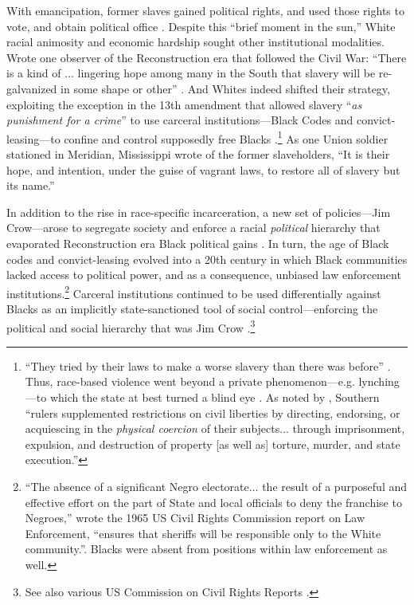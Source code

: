 \documentclass[12pt]{article}
\begin{document}
With emancipation, former slaves gained political rights, and used those rights to vote, and obtain political office .  Despite this ``brief moment in the sun,'' White racial animosity and economic hardship sought other institutional modalities.  Wrote one observer of the Reconstruction era that followed the Civil War: ``There is a kind of $\ldots$ lingering hope among many in the South that slavery will be re-galvanized in some shape or other'' . And Whites indeed shifted their strategy, exploiting the exception in the 13th amendment that allowed slavery ``\emph{as punishment for a crime}'' to use carceral institutions---Black Codes and convict-leasing---to confine and control supposedly free Blacks .\footnote{``They tried by their laws to make a worse slavery than there was before'' . Thus, race-based violence went beyond a private phenomenon---e.g. lynching---to which the state at best turned a blind eye .  As noted by , Southern ``rulers supplemented restrictions on civil liberties by directing, endorsing, or acquiescing in the \emph{physical coercion} of their subjects$\ldots$ through imprisonment, expulsion, and destruction of property [as well as] torture, murder, and state execution.''}  As one Union soldier stationed in Meridian, Mississippi wrote of the former slaveholders, ``It is their hope, and intention, under the guise of vagrant laws, to restore all of slavery but its name.''

In addition to the rise in race-specific incarceration, a new set of policies---Jim Crow---arose to segregate society and enforce a racial \emph{political} hierarchy that evaporated Reconstruction era Black political gains . In turn, the age of Black codes and convict-leasing evolved into a 20th century in which Black communities lacked access to political power, and as a consequence, unbiased law enforcement institutions.\footnote{``The absence of a significant Negro electorate$\ldots$ the result of a purposeful and effective effort on the part of State and local officials to deny the franchise to Negroes,'' wrote the 1965 US Civil Rights Commission report on Law Enforcement, ``ensures that sheriffs will be responsible only to the White community.''\citep[87]{USCCRUnitedStatesCommissiononCivilRights:1965wk}.  Blacks were absent from positions within law enforcement as well.}  Carceral institutions continued to be used differentially against Blacks as an implicitly state-sanctioned tool of social control---enforcing the political and social hierarchy that was Jim Crow .\footnote{See also various US Commission on Civil Rights Reports .}
\end{document}
